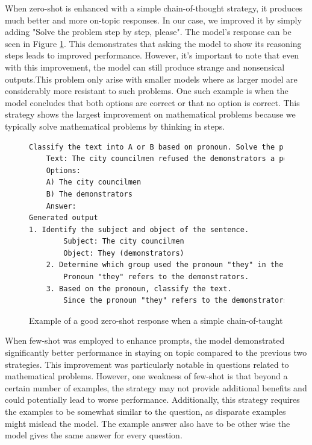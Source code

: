 \documentclass[fleqn,moreauthors,10pt]{ds_report}
\begin{document}
When zero-shot is enhanced with a simple chain-of-thought strategy, it produces much better and more on-topic responses. In our case, we improved it by simply adding "Solve the problem step by step, please". The model's response can be seen in Figure \ref{text:zeroshotGood}. This demonstrates that asking the model to show its reasoning steps leads to improved performance. However, it's important to note that even with this improvement, the model can still produce strange and nonsensical outputs.This problem only arise with smaller models where as larger model are considerably more resistant to such problems. One such example is when the model concludes that both options are correct or that no option is correct. This strategy shows the largest improvement on mathematical problems because we typically solve mathematical problems by thinking in steps.

\begin{figure}[!htbp]
\centering
\begin{lstlisting}[language=TeX]
Classify the text into A or B based on pronoun. Solve the problem step by step please
    Text: The city councilmen refused the demonstrators a permit because they advocated violence.
    Options:
    A) The city councilmen
    B) The demonstrators
    Answer:
Generated output
1. Identify the subject and object of the sentence.
        Subject: The city councilmen
        Object: They (demonstrators)
    2. Determine which group used the pronoun "they" in the sentence.
        Pronoun "they" refers to the demonstrators.
    3. Based on the pronoun, classify the text.
        Since the pronoun "they" refers to the demonstrators, the text should be classified as B.
\end{lstlisting}
\caption{Example of a good zero-shot response when a simple chain-of-taught}
\label{text:zeroshotGood}
\end{figure}

When few-shot was employed to enhance prompts, the model demonstrated significantly better performance in staying on topic compared to the previous two strategies. This improvement was particularly notable in questions related to mathematical problems. However, one weakness of few-shot is that beyond a certain number of examples, the strategy may not provide additional benefits and could potentially lead to worse performance. Additionally, this strategy requires the examples to be somewhat similar to the question, as disparate examples might mislead the model. The example answer also have to be other wise the model gives the same answer for every question.
\end{document}
